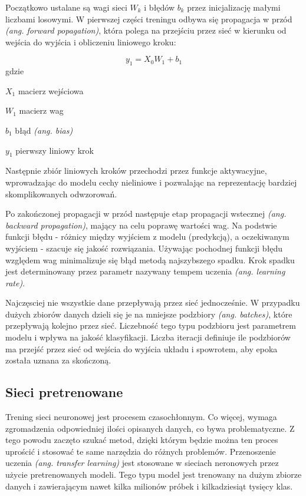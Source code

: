 Początkowo ustalane są wagi sieci $W_k$ i błędów $b_k$ przez inicjalizację małymi liczbami losowymi. W pierwszej części treningu odbywa się propagacja w przód \textit{(ang. forward popagation)}, która polega na przejściu przez sieć w kierunku od wejścia do wyjścia i obliczeniu liniowego kroku:

\begin{equation}
y_1 = X_0 W_1 + b_1
\end{equation}
gdzie
\begin{eqwhere}[2cm]
	\item[$X_1$] macierz wejściowa
	\item[$W_1$] macierz wag
	\item[$b_1$] błąd \textit{(ang. bias)}
	\item[$y_1$] pierwszy liniowy krok
\end{eqwhere}

Następnie zbiór liniowych kroków przechodzi przez funkcje aktywacyjne, wprowadzając do modelu cechy nieliniowe i pozwalając na reprezentację bardziej skomplikowanych odwzorowań.

Po zakończonej propagacji w przód następuje etap propagacji wstecznej \textit{(ang. backward propagation)}, mający na celu poprawę wartości wag. Na podstwie funkcji błędu - różnicy między wyjściem z modelu (predykcją), a oczekiwanym wyjściem - szacuje się jakość rozwiązania. Używając pochodnej funkcji błędu względem wag minimalizuje się błąd metodą najszybszego spadku. Krok spadku jest determinowany przez parametr nazywany tempem uczenia \textit{(ang. learning rate)}. 

Najczęsciej nie wszystkie dane przepływają przez sieć jednocześnie. W przypadku dużych zbiorów danych dzieli się je na mniejsze podzbiory \textit{(ang. batches)}, które przepływają kolejno przez sieć. Liczebność tego typu podzbioru jest parametrem modelu i wpływa na jakość klasyfikacji. Liczba iteracji definiuje ile podzbiorów ma przejść przez sieć od wejścia do wyjścia układu i spowrotem, aby epoka została uznana za skończoną. 

\subsection{Sieci pretrenowane}

Trening sieci neuronowej jest procesem czasochłonnym. Co więcej, wymaga zgromadzenia odpowiedniej ilości opisanych danych, co bywa problematyczne. Z tego powodu zaczęto szukać metod, dzięki którym będzie można ten proces uprościć i stosować te same narzędzia do różnych problemów. Przenoszenie uczenia \textit{(ang. transfer learning)} jest stosowane w sieciach neronowych przez użycie pretrenowanych modeli. Tego typu model jest trenowany na dużym zbiorze danych i zawierającym nawet kilka milionów próbek i kilkadziesiąt tysięcy klas. 

